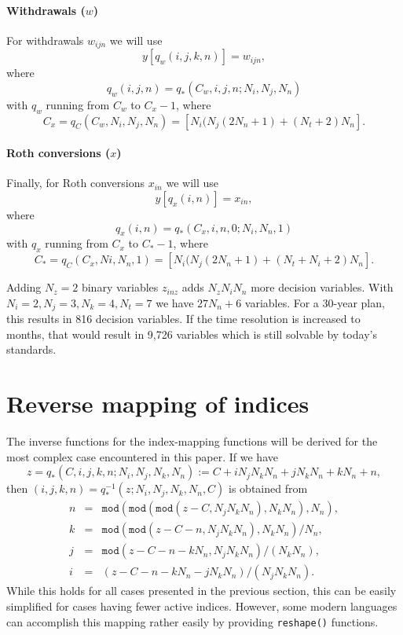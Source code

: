 \documentclass{report}[fleqn,12pt]
\begin{document}
\paragraph*{Withdrawals (\boldmath$w$)}
For withdrawals $w_{ijn}$ we will use
\begin{equation}
	y[q_w(i, j, k, n)] = w_{i j n},
\end{equation}
where
\begin{equation}
	q_w(i, j, n) = q_*(C_w, i, j, n; N_i, N_j, N_n)
\end{equation}
with $q_w$ running from $C_w$ to $C_x - 1$, where
\[
	C_x = q_C(C_w, N_i, N_j, N_n) = [N_i(N_j(2N_n + 1) + (N_t + 2) N_n].
\]

\paragraph*{Roth conversions (\boldmath$x$)}
Finally, for Roth conversions $x_{in}$ we will use
\begin{equation}
	y[q_x(i, n)] = x_{i n},
\end{equation}
where
\begin{equation}
	q_x(i, n) = q_*(C_x, i, n, 0; N_i, N_n, 1)
\end{equation}
with $q_x$ running from $C_x$ to $C_* - 1$, where
\[
	C_* = q_C(C_x, Ni, N_n, 1) = [N_i(N_j(2N_n + 1) + (N_t + N_i + 2) N_n].
\]

Adding $N_z=2$ binary variables $z_{inz}$ adds $N_zN_iN_n$ more decision variables.
With $N_i = 2, N_j = 3, N_k = 4, N_t = 7$ we have $27 N_n + 6$ variables. For
a 30-year plan, this results in 816 decision variables. If the time resolution is increased to
months, that would result in 9,726 variables which is still solvable by today's standards.

\section{Reverse mapping of indices}
The inverse functions for the index-mapping functions will be derived for the
most complex case encountered in this paper.
If we have
\begin{equation}
	z = q_*(C, i, j, k, n; N_i, N_j, N_k, N_n) := C + iN_jN_kN_n + jN_kN_n + kN_n + n,
\end{equation}
then $(i, j, k, n) = q_*^{-1}(z; N_i, N_j, N_k, N_n, C)$ is obtained from
\begin{eqnarray}
	n &=& \texttt{mod}(\texttt{mod}(\texttt{mod}(z - C, N_jN_kN_n), N_kN_n), N_n), \nonumber \\
	k &=& \texttt{mod}(\texttt{mod}(z - C - n, N_jN_kN_n), N_kN_n)/N_n, \nonumber \\
	j &=& \texttt{mod}(z - C - n - kN_n, N_jN_kN_n)/(N_kN_n), \nonumber \\
	i &=& (z - C - n - kN_n - jN_kN_n)/(N_jN_kN_n).
\end{eqnarray}
While this holds for all cases presented in the previous section, this can be easily simplified
for cases having fewer active indices. However, some modern languages can accomplish this
mapping rather easily by providing \texttt{reshape()} functions.
\end{document}

